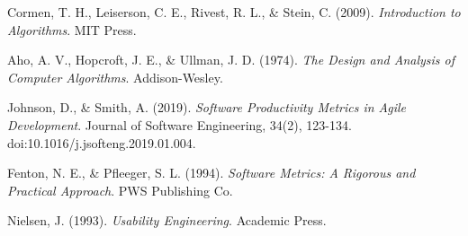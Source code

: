 \documentclass{article}
\begin{document}
\begin{thebibliography}{9}

Cormen, T. H., Leiserson, C. E., Rivest, R. L., \& Stein, C. (2009). 
\textit{Introduction to Algorithms}. 
MIT Press.

Aho, A. V., Hopcroft, J. E., \& Ullman, J. D. (1974). 
\textit{The Design and Analysis of Computer Algorithms}. 
Addison-Wesley.

Johnson, D., \& Smith, A. (2019). 
\textit{Software Productivity Metrics in Agile Development}. 
Journal of Software Engineering, 34(2), 123-134. doi:10.1016/j.jsofteng.2019.01.004.

Fenton, N. E., \& Pfleeger, S. L. (1994). 
\textit{Software Metrics: A Rigorous and Practical Approach}. 
PWS Publishing Co.

Nielsen, J. (1993). 
\textit{Usability Engineering}. 
Academic Press.

\end{thebibliography}
\end{document}
